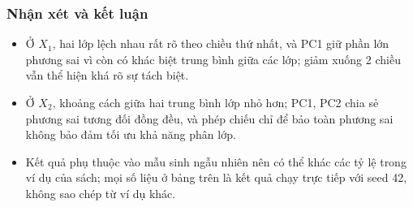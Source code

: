 \subsubsection{Nhận xét và kết luận}
\begin{itemize}
\item Ở \(X_1\), hai lớp lệch nhau rất rõ theo chiều thứ nhất, và PC1 giữ phần lớn phương sai vì còn có khác biệt trung bình giữa các lớp; giảm xuống 2 chiều vẫn thể hiện khá rõ sự tách biệt.
\item Ở \(X_2\), khoảng cách giữa hai trung bình lớp nhỏ hơn; PC1, PC2 chia sẻ phương sai tương đối đồng đều, và phép chiếu chỉ để bảo toàn phương sai không bảo đảm tối ưu khả năng phân lớp.
\item Kết quả phụ thuộc vào mẫu sinh ngẫu nhiên nên có thể khác các tỷ lệ trong ví dụ của sách; mọi số liệu ở bảng trên là kết quả chạy trực tiếp với seed 42, không sao chép từ ví dụ khác.
\end{itemize}


